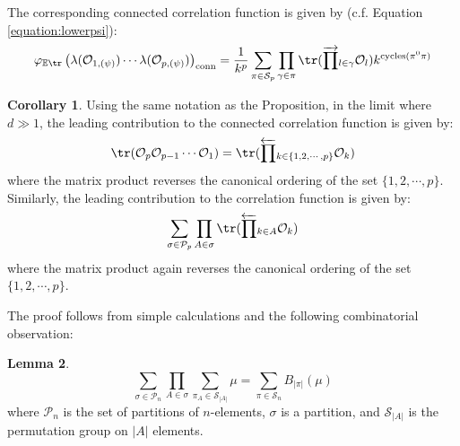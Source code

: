 \documentclass[a4paper,11pt]{article}
\theoremstyle{definition}
\numberwithin{equation}{section}
\newtheorem{lemma}{Lemma}[section]
\newtheorem{corollary}[lemma]{Corollary}
\newcommand{\lb}{\left(}
\newcommand{\rb}{\right)}
\begin{document}
The corresponding connected correlation function is given by (c.f. Equation \ref{equation:lowerpsi}):
\begin{equation}\label{equation:connectedmomentforJT}
    \varphi_{\mathbb{E}\tr}\lb\lambda(\mathcal{O}_{1,(\psi)})\cdots\lambda(\mathcal{O}_{p,(\psi)})\rb_\text{conn} = \frac{1}{k^p}\sum_{\pi\in\mathcal{S}_p}\prod_{\gamma\in\pi}\tr(\overrightarrow{\prod}_{l\in \gamma}\mathcal{O}_l)k^{\text{cycles}(\pi^0\pi)}
\end{equation}
\begin{corollary}\label{corollary:planar}
    Using the same notation as the Proposition, in the limit where $d\gg 1$, the leading contribution to the connected correlation function is given by:
    \begin{equation}
        \tr(\mathcal{O}_p\mathcal{O}_{p-1}\cdots\mathcal{O}_1) = \tr(\overleftarrow{\prod}_{k\in \{1,2,\cdots,p\}}\mathcal{O}_k)
    \end{equation}
    where the matrix product reverses the canonical ordering of the set $\{1,2,\cdots,p\}$. Similarly, the leading contribution to the correlation function is given by:
    \begin{equation}
        \sum_{\sigma\in\mathcal{P}_p}\prod_{A\in\sigma}\tr(\overleftarrow{\prod}_{k\in A}\mathcal{O}_k)
    \end{equation}
    where the matrix product again reverses the canonical ordering of the set $\{1,2,\cdots,p\}$. 
\end{corollary}
The proof follows from simple calculations and the following combinatorial observation:
\begin{lemma}
    \begin{equation}
        \sum_{\sigma\in\mathcal{P}_n}\prod_{A\in\sigma}\sum_{\pi_A\in \mathcal{S}_{|A|}}\mu = \sum_{\pi\in\mathcal{S}_n}B_{|\pi|}(\mu)
    \end{equation}
    where $\mathcal{P}_n$ is the set of partitions of $n$-elements, $\sigma$ is a partition, and $\mathcal{S}_{|A|}$ is the permutation group on $|A|$ elements.
\end{lemma}
\end{document}
